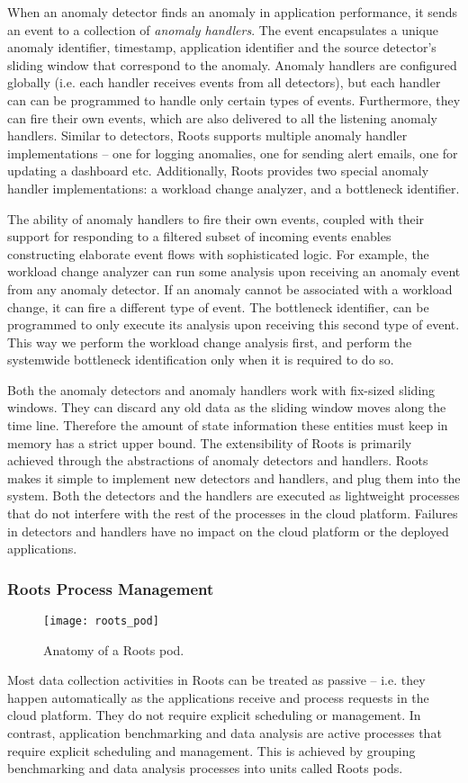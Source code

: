 When an anomaly detector finds an anomaly in application performance, it sends an event
to a collection of \textit{anomaly handlers}. The event encapsulates a unique anomaly identifier, 
timestamp, application identifier and the source detector's sliding window that correspond to the
anomaly. Anomaly handlers are configured globally (i.e. each handler
receives events from all detectors), but each handler can can be programmed to handle only
certain types of events. Furthermore, they can fire their own events, which are also delivered to
all the listening anomaly handlers. Similar to detectors, Roots supports multiple anomaly handler
implementations -- one for logging anomalies, one for sending alert emails, one
for updating a dashboard etc. Additionally, Roots provides two special anomaly handler
implementations: a workload change analyzer, and a bottleneck identifier.

The ability of anomaly handlers to fire their own events, coupled with their support
for responding to a filtered subset of incoming events enables constructing
elaborate event flows with sophisticated logic. For example, the workload
change analyzer can run some analysis upon receiving an anomaly event
from any anomaly detector. If an anomaly cannot be associated with a workload
change, it can fire a different type of event. The bottleneck identifier, can
be programmed to only execute its analysis upon receiving this second type of event.
This way we perform the workload change analysis first, and perform the
systemwide bottleneck identification only when it is required to do so.

Both the anomaly detectors and anomaly handlers work with fix-sized sliding windows.
They can discard any old data as the sliding window moves along the time line.
Therefore the amount of state information these entities must keep in memory has
a strict upper bound. 
The extensibility of Roots is primarily achieved through the abstractions of anomaly
detectors and handlers. Roots makes it simple to implement new detectors and handlers,
and plug them into the system. Both the detectors and the handlers are executed
as lightweight processes that do not interfere with the rest of the processes in
the cloud platform. Failures in detectors and handlers have no impact
on the cloud platform or the deployed applications.

\subsubsection{Roots Process Management}
\begin{figure}
\centering
\texttt{[image: roots\_pod]}
\caption{Anatomy of a Roots pod.}
\label{fig:roots_pod}
\end{figure}
Most data collection activities in Roots can be treated as passive -- i.e. they
happen automatically as the applications receive and process requests in the cloud
platform. They do not require explicit scheduling or management. In contrast,
application benchmarking and data analysis are active processes that require
explicit scheduling and management.  This is achieved by grouping benchmarking
and data analysis processes into units called Roots pods. 

